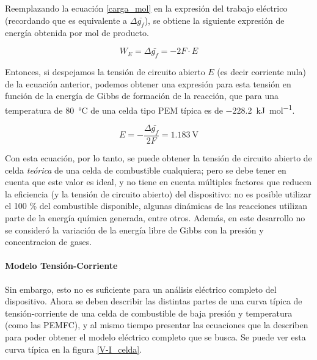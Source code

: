 Reemplazando la ecuación \ref{carga_mol} en la expresión del trabajo eléctrico (recordando que es equivalente a $\Delta\bar{g_f}$), se obtiene la siguiente expresión de energía obtenida por mol de producto.

\begin{equation}\label{trabajo_elec}
    W_E=\Delta\bar{g_f}=-2F\cdot E
\end{equation}

Entonces, si despejamos la tensión de circuito abierto $E$ (es decir corriente nula) de la ecuación anterior, podemos obtener una expresión para esta tensión en función de la energía de Gibbs de formación de la reacción, que para una temperatura de \SI{80}{\celsius} de una celda tipo PEM típica es de \SI{-228.2}{\kilo\joule\per\mole}.\textsuperscript{\cite{FCSysExplained}}

\begin{equation}\label{tension_vacio}
    \boxed{E=-\frac{\Delta\bar{g_f}}{2F}=\SI{1.183}{\volt}}
\end{equation}

Con esta ecuación, por lo tanto, se puede obtener la {\Medium tensión de circuito abierto de celda} \textit{teórica} de una celda de combustible cualquiera; pero se debe tener en cuenta que este valor es ideal, y no tiene en cuenta múltiples factores que reducen la eficiencia (y la tensión de circuito abierto) del dispositivo: no es posible utilizar el 100 \% del combustible disponible, algunas dinámicas de las reacciones utilizan parte de la energía química generada, entre otros. Además, en este desarrollo no se consideró la variación de la energía libre de Gibbs con la presión y concentracion de gases.\\

\paragraph{Modelo Tensión-Corriente}

Sin embargo, esto no es suficiente para un análisis eléctrico completo del dispositivo. Ahora se deben describir las distintas partes de una curva típica de tensión-corriente de una celda de combustible de baja presión y temperatura (como las PEMFC), y al mismo tiempo presentar las ecuaciones que la describen para poder obtener el modelo eléctrico completo que se busca. Se puede ver esta curva típica en la figura \ref{V-I_celda}.


